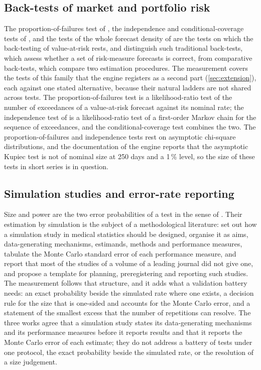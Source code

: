 \subsection{Back-tests of market and portfolio risk}
\label{sec:rw-backtests}

The proportion-of-failures test of \citet{kupiec1995}, the independence and conditional-coverage tests of \citet{christoffersen1998}, and the tests of the whole forecast density of \citet{berkowitz2001} are the tests on which the back-testing of value-at-risk rests, and \citet{nolde2017} distinguish such traditional back-tests, which assess whether a set of risk-measure forecasts is correct, from comparative back-tests, which compare two estimation procedures.
The measurement covers the tests of this family that the engine registers as a second part (\cref{sec:extension}), each against one stated alternative, because their natural ladders are not shared across tests. The proportion-of-failures test is a likelihood-ratio test of the number of exceedances of a value-at-risk forecast against its nominal rate; the independence test of \citet{christoffersen1998} is a likelihood-ratio test of a first-order Markov chain for the sequence of exceedances, and the conditional-coverage test combines the two. The proportion-of-failures and independence tests rest on asymptotic chi-square distributions, and the documentation of the engine reports that the asymptotic Kupiec test is not of nominal size at 250 days and a 1\,\% level, so the size of these tests in short series is in question.

\subsection{Simulation studies and error-rate reporting}
\label{sec:rw-simulation}

Size and power are the two error probabilities of a test in the sense of \citet{neymanpearson1933}.
Their estimation by simulation is the subject of a methodological literature: \citet{burton2006} set out how a simulation study in medical statistics should be designed, \citet{morris2019} organise it as aims, data-generating mechanisms, estimands, methods and performance measures, tabulate the Monte Carlo standard error of each performance measure, and report that most of the studies of a volume of a leading journal did not give one, and \citet{siepe2024} propose a template for planning, preregistering and reporting such studies.
The measurement follows that structure, and it adds what a validation battery needs: an exact probability beside the simulated rate where one exists, a decision rule for the size that is one-sided and accounts for the Monte Carlo error, and a statement of the smallest excess that the number of repetitions can resolve. The three works agree that a simulation study states its data-generating mechanisms and its performance measures before it reports results and that it reports the Monte Carlo error of each estimate; they do not address a battery of tests under one protocol, the exact probability beside the simulated rate, or the resolution of a size judgement.


